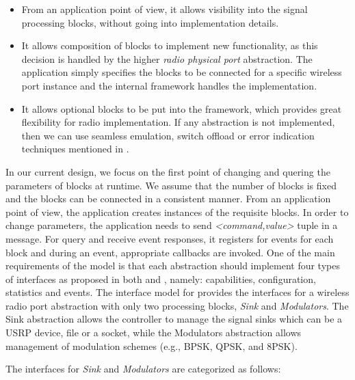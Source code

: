 \begin{itemize}
\item From an application point of view, it allows visibility into the signal processing blocks, without going into implementation details.
\item It allows composition of blocks to implement new functionality, as this decision is handled by the higher \emph{radio physical port} abstraction. The application simply specifies the blocks to be connected for a specific wireless port instance and the internal framework handles the implementation.
\item It allows optional blocks to be put into the framework, which provides great flexibility for radio implementation. If any abstraction is not implemented, then we can use seamless emulation, switch offload or error indication techniques mentioned in \cite{Casey:14}.
\end{itemize}

In our current design, we focus on the first point of changing and quering the parameters of blocks at runtime. We assume that the number of blocks is fixed and the blocks can be connected in a consistent manner. From an application point of view, the application creates instances of the requisite blocks. In order to change parameters, the application needs to send \emph{<command,value>} tuple in a message. For query and receive event responses, it registers for events for each block and during an event, appropriate callbacks are invoked.    
One of the main requirements of the \crossflow model is that each abstraction should implement four types of interfaces as proposed in both \cite{Casey:14} and \cite{aetherflow}, namely: capabilities, configuration, statistics and events. The interface model for \crossflow provides the interfaces for a wireless radio port abstraction with only two processing blocks, \emph{Sink} and \emph{Modulators}. The Sink abstraction allows the controller to manage the signal sinks which can be a USRP device, file or a socket, while the Modulators abstraction allows management of modulation schemes (e.g., BPSK, QPSK, and 8PSK).

The interfaces for \emph{Sink} and \emph{Modulators} are categorized as follows:

